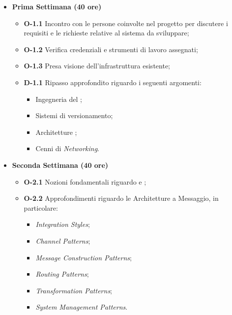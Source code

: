 \begin{itemize}
       \item \textbf{Prima Settimana (40 ore)}
       \begin{itemize}
           \item \textbf{O-1.1} Incontro con le persone coinvolte nel progetto per discutere i requisiti e le richieste relative al sistema da sviluppare;
           \item \textbf{O-1.2} Verifica credenziali e strumenti di lavoro assegnati;
           \item \textbf{O-1.3} Presa visione dell’infrastruttura esistente;
           \item \textbf{D-1.1} Ripasso approfondito riguardo i seguenti argomenti:
             \begin{itemize}
               \item Ingegneria del \software;
               \item Sistemi di versionamento;
               \item Architetture \software;
               \item Cenni di \textit{Networking}.
             \end{itemize}
       \end{itemize}

       \item \textbf{Seconda Settimana (40 ore)}
       \begin{itemize}
           \item \textbf{O-2.1} Nozioni fondamentali riguardo  e ;
           \item \textbf{O-2.2} Approfondimenti riguardo le Architetture a Messaggio, in particolare:
             \begin{itemize}
               \item \textit{Integration Styles};
               \item \textit{Channel Patterns};
               \item \textit{Message Construction Patterns};
               \item \textit{Routing Patterns};
               \item \textit{Transformation Patterns};
               \item \textit{System Management Patterns}.
             \end{itemize}
       \end{itemize}


\end{itemize}
